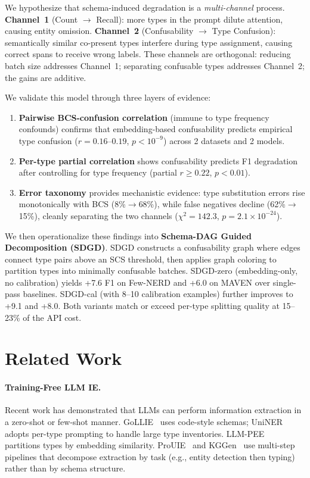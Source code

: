 \documentclass[11pt,a4paper]{article}
\begin{document}
We hypothesize that schema-induced degradation is a \emph{multi-channel} process.
\textbf{Channel~1} (Count $\to$ Recall): more types in the prompt dilute attention, causing entity omission.
\textbf{Channel~2} (Confusability $\to$ Type Confusion): semantically similar co-present types interfere during type assignment, causing correct spans to receive wrong labels.
These channels are orthogonal: reducing batch size addresses Channel~1; separating confusable types addresses Channel~2; the gains are additive.

We validate this model through three layers of evidence:
\begin{enumerate}
    \item \textbf{Pairwise BCS-confusion correlation} (immune to type frequency confounds) confirms that embedding-based confusability predicts empirical type confusion ($r{=}0.16$--$0.19$, $p{<}10^{-9}$) across 2 datasets and 2 models.
    \item \textbf{Per-type partial correlation} shows confusability predicts F1 degradation after controlling for type frequency (partial $r{\geq}0.22$, $p{<}0.01$).
    \item \textbf{Error taxonomy} provides mechanistic evidence: type substitution errors rise monotonically with BCS (8\%$\to$68\%), while false negatives decline (62\%$\to$15\%), cleanly separating the two channels ($\chi^2{=}142.3$, $p{=}2.1{\times}10^{-24}$).
\end{enumerate}

We then operationalize these findings into \textbf{Schema-DAG Guided Decomposition (SDGD)}.
SDGD constructs a confusability graph where edges connect type pairs above an SCS threshold, then applies graph coloring to partition types into minimally confusable batches.
SDGD-zero (embedding-only, no calibration) yields +7.6 F1 on Few-NERD and +6.0 on MAVEN over single-pass baselines.
SDGD-cal (with 8--10 calibration examples) further improves to +9.1 and +8.0.
Both variants match or exceed per-type splitting quality at 15--23\% of the API cost.

\section{Related Work}
\label{sec:related}

\paragraph{Training-Free LLM IE.}
Recent work has demonstrated that LLMs can perform information extraction in a zero-shot or few-shot manner.
GoLLIE~\cite{} uses code-style schemas; UniNER~\cite{} adopts per-type prompting to handle large type inventories.
LLM-PEE~\cite{} partitions types by embedding similarity.
ProUIE~\cite{} and KGGen~\cite{} use multi-step pipelines that decompose extraction by task (e.g., entity detection then typing) rather than by schema structure.
\end{document}
